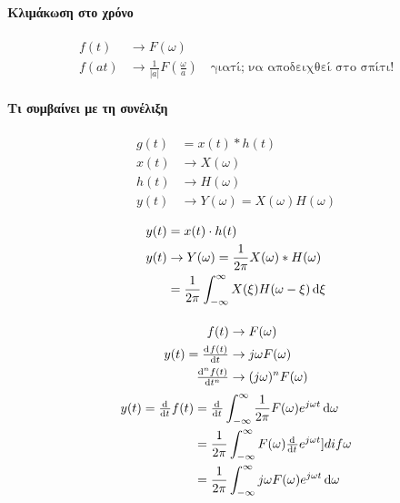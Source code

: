 \documentclass[11pt,a4paper,titlepage,fleqn]{article}
\begin{document}
	 \paragraph{Κλιμάκωση στο χρόνο}
	 \begin{align*}
	 f(t) &\to F(\omega )\\
	 f(at)&\to \frac{1}{|a|}F\left( \frac{\omega }{a} \right)
	 \quad \text{γιατί; να αποδειχθεί στο σπίτι!}
	 \end{align*}
	 
     \paragraph{Τι συμβαίνει με τη συνέλιξη}
     \begin{align*}
     g(t) &= x(t)*h(t) \\
     x(t)&\to X(\omega )\\
     h(t)&\to H(\omega )\\
     y(t)&\to Y(\omega) = X(\omega)H(\omega)
     \end{align*}
     
     \begin{align*}
     y(t) &= x(t)\cdot h(t)\\
     y(t) &\to Y(\omega) = \frac{1}{2\pi}X(\omega)*H(\omega )
     \\ &= \frac{1}{2\pi} \int_{-\infty}^{\infty} X(\xi)H(\omega-\xi)\dif\xi
     \end{align*}
     
     \paragraph{}
     \begin{align*}
     f(t) &\to F(\omega)\\
     y(t)=\od{f(t)}{t}&\to j\omega F(\omega ) \\
     \od[n]{f(t)}{t}&\to (j\omega )^nF(\omega )
     \end{align*}
     \begin{align*}
     y(t)=\od{}{t}f(t) &= \od{}{t} \int_{-\infty}^{\infty} \frac{1}{2\pi}
     F(\omega ) e^{j\omega t}\dif \omega 
     \\ &= \frac{1}{2\pi}\int_{-\infty}^{\infty} F(\omega )\od{}{t}
     e^{j\omega t}]dif \omega 
     \\ &= \frac{1}{2\pi} \int_{-\infty}^{\infty} j\omega F(\omega )
     e^{j\omega t}\dif \omega 
     \end{align*}
     \subparagraph{}
     
\end{document}
